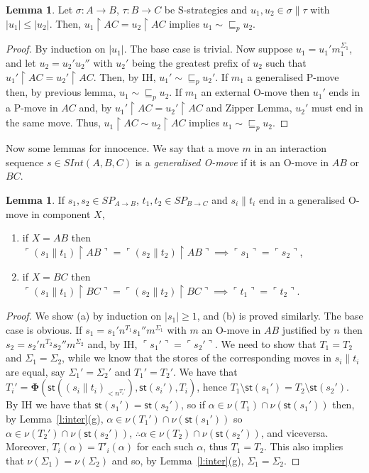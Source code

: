 \documentclass{CSML}
\theoremstyle{definition}\newtheorem{definition}[thm]{Definition}
\theoremstyle{definition}\newtheorem{example}[thm]{Example}
\theoremstyle{definition}\newtheorem{proposition}[thm]{Proposition}
\theoremstyle{definition}\newtheorem{lemma}[thm]{Lemma}
\theoremstyle{definition}\newtheorem{theorem}[thm]{Theorem}
\theoremstyle{definition}\newtheorem{corollary}[thm]{Corollary}
\theoremstyle{definition}\newtheorem{remark}[thm]{Remark}
\renewcommand\Sigma{\varSigma}
\newcommand\Tau{T}
\newcommand\arr{\rightarrow}
\newcommand\rest{\upharpoonright}
\newcommand\iseq{\mathop{\|}}
\newcommand\remv{\setminus}
\newcommand\nice{\boldsymbol\Phi}
\newcommand\Splays[1]{\mathit{SP}_{#1}}
\newcommand\st[1]{\mathsf{st}(#1)}
\newcommand\Sinter[1]{\mathit{SInt}(#1)}
\newcommand\prefix{\sqsubseteq_p}
\newcommand\pview[1]{\ulcorner{#1}\urcorner}
\newcommand\pv[1]{\pview{#1}}
\newcommand\na\alpha
\begin{document}
\begin{lemma}\label{l:det_other}
Let $\sigma:A\arr B$, $\tau:B\arr C$ be S-strategies and $u_1,u_2\in\sigma\iseq\tau$ with $|u_1|\leq|u_2|$. Then, $u_1\rest AC=u_2\rest AC$ implies $u_1\sim\prefix u_2$.
\end{lemma}
\begin{proof}
By induction on $|u_1|$. The base case is trivial. 
Now suppose $u_1=u_1'm_1^{\Sigma_1}$, and let $u_2=u_2'u_2''$ with $u_2'$ being the greatest prefix of $u_2$ such that $u_1'\rest AC=u_2'\rest AC$. 
Then, by IH, $u_1'\sim\prefix u_2'$.
If $m_1$ a generalised P-move then, by previous lemma, $u_1\sim\prefix u_2$.
If $m_1$ an external O-move then $u_1'$ ends in a P-move in $AC$ and, by $u_1'\rest AC=u_2'\rest AC$ and Zipper Lemma, $u_2'$ must end in the same move. Thus, $u_1\rest AC\sim u_2\rest AC$ implies $u_1\sim\prefix u_2$.
\end{proof}

Now some lemmas for innocence. We say that a move $m$ in an interaction sequence $s\in\Sinter{A,B,C}$ is a \emph{generalised O-move} if it is an O-move in $AB$ or $BC$.

\begin{lemma}\label{l:proj}
If $s_1,s_2\in\Splays{A\arr B}$, $t_1,t_2\in\Splays{B\arr C}$ and $s_i\iseq t_i$ end in a generalised O-move in component $X$,
\begin{enumerate}\renewcommand{\theenumi}{\rm\alph{enumi}}
\item if $X=AB$ then $\pv{(s_1\iseq t_1)\rest AB}=\pv{(s_2\iseq t_2)\rest AB}\implies\pv{s_1}=\pv{s_2}$,
\item if $X=BC$ then $\pv{(s_1\iseq t_1)\rest BC}=\pv{(s_2\iseq t_2)\rest BC}\implies\pv{t_1}=\pv{t_2}$.
\end{enumerate}
\end{lemma}
\begin{proof}
We show (a) by induction on $|s_1|\geq1$, and (b) is proved similarly. The base case is obvious. If $s_1=s_1'n^{\Tau_1}s_1''m^{\Sigma_1}$ with $m$ an O-move in $AB$ justified by $n$ then $s_2=s_2'n^{\Tau_2}s_2''m^{\Sigma_2}$ and, by IH, $\pv{s_1'}=\pv{s_2'}$. We need to show that $\Tau_1=\Tau_2$ and
$\Sigma_1=\Sigma_2$, while we know that the stores of the corresponding moves in $s_i\iseq t_i$ are equal, say $\Sigma_1'=\Sigma_2'$ and $\Tau_1'=\Tau_2'$. We have that $\Tau_i'=\nice(\st{(s_i\iseq t_i)_{<n^{\Tau_i'}}},\st{s_i'},\Tau_i)$, hence $\Tau_1\remv\st{s_1'}=\Tau_2\remv\st{s_2'}$. By IH we have that $\st{s_1'}=\st{s_2'}$, so if $\na\in\nu(\Tau_1)\cap\nu(\st{s_1'})$ then, by Lemma~\ref{l:inter}(g), $\na\in\nu(\Tau_1')\cap\nu(\st{s_1'})$ so $\na\in\nu(\Tau_2')\cap\nu(\st{s_2'})$, $\therefore\na\in\nu(\Tau_2)\cap\nu(\st{s_2'})$, and viceversa. Moreover, $\Tau_i(\na)=\Tau'_i(\na)$ for each such $\na$, thus $\Tau_1=\Tau_2$. This also implies that $\nu(\Sigma_1)=\nu(\Sigma_2)$ and so, by Lemma~\ref{l:inter}(g), $\Sigma_1=\Sigma_2$.
\end{proof}
\end{document}
